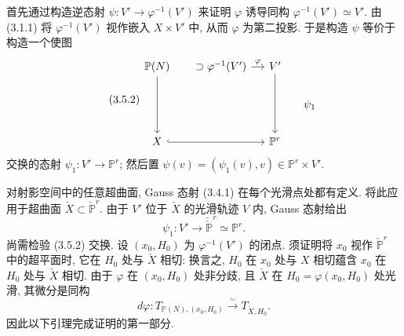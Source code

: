 首先通过构造逆态射 $\psi:V'\to\varphi^{-1}(V')$ 来证明 $\varphi$ 诱导同构 $\varphi^{-1}(V')\simeq V'$. 由 (3.1.1) 将 $\varphi^{-1}(V')$ 视作嵌入 $X\times V'$ 中, 从而 $\varphi$ 为第二投影. 于是构造 $\psi$ 等价于构造一个使图
\begin{equation}\tag{3.5.2}
\begin{tikzcd}[column sep=small]
\mathbb P(N) \arrow[dd]
  & {}\supset\varphi^{-1}(V') \arrow[r,"\varphi"]
  & V' \arrow[dd] & \\
  & & & \psi_1 \\
X \arrow[rr,hook] & & \mathbb P^r &
\end{tikzcd}
\end{equation}
交换的态射 $\psi_1:V'\to\mathbb P^r$; 然后置 $\psi(v)=(\psi_1(v),v)\in\mathbb P^r\times V'$.

对射影空间中的任意超曲面, Gauss 态射 (3.4.1) 在每个光滑点处都有定义. 将此应用于超曲面 $\check X\subset\check{\mathbb P}^{r}$. 由于 $V'$ 位于 $\check X$ 的光滑轨迹 $V$ 内, Gauss 态射给出
\begin{equation}\tag{3.5.3}
\psi_1:V'\longrightarrow
\check{\check{\mathbb P}}^{r}\simeq\mathbb P^r.
\end{equation}
尚需检验 (3.5.2) 交换. 设 $(x_0,H_0)$ 为 $\varphi^{-1}(V')$ 的闭点. 须证明将 $x_0$ 视作 $\check{\mathbb P}^{r}$ 中的超平面时, 它在 $H_0$ 处与 $\check X$ 相切: 换言之, $H_0$ 在 $x_0$ 处与 $X$ 相切蕴含 $x_0$ 在 $H_0$ 处与 $\check X$ 相切. 由于 $\varphi$ 在 $(x_0,H_0)$ 处非分歧, 且 $\check X$ 在 $H_0=\varphi(x_0,H_0)$ 处光滑, 其微分是同构
\begin{equation}\tag{3.5.4}
d\varphi:
T_{\mathbb P(N),(x_0,H_0)}\xrightarrow{\sim}T_{\check X,H_0}.
\end{equation}
因此以下引理完成证明的第一部分.
